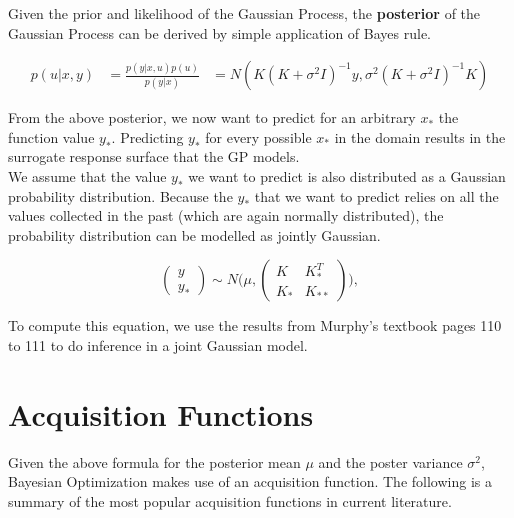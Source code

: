 
Given the prior and likelihood of the Gaussian Process, the \textbf{posterior} of the Gaussian Process can be derived by simple application of Bayes rule.

\begin{align}
p(u | x, y) &= \frac{ p(y | x, u) p(u) }{p(y | x)}
& = N( K(K +\sigma^2 I)^{-1}y, \sigma^2 (K + \sigma^2 I)^{-1} K )
\end{align}

From the above posterior, we now want to predict for an arbitrary $x_*$ the function value $y_*$.
Predicting $y_*$ for every possible $x_*$ in the domain results in the surrogate response surface that the GP models. \\

We assume that the value $y_*$ we want to predict is also distributed as a Gaussian probability distribution. 
Because the $y_*$ that we want to predict relies on all the values collected in the past (which are again normally distributed), the probability distribution can be modelled as jointly Gaussian.

\begin{equation}
\begin{pmatrix} y \\
y_* \end{pmatrix} \sim N\Biggl(\mu,\begin{pmatrix} K & K^T_*\\
 K_* & K_{**} \end{pmatrix}\Biggr),
\end{equation}

To compute this equation, we use the results from Murphy's textbook \citep{Murphy} pages 110 to 111 to do inference in a joint Gaussian model.

\section{Acquisition Functions}

Given the above formula for the posterior mean $\mu$ and the poster variance $\sigma^2$, Bayesian Optimization makes use of an acquisition function.
The following is a summary of the most popular acquisition functions in current literature.


